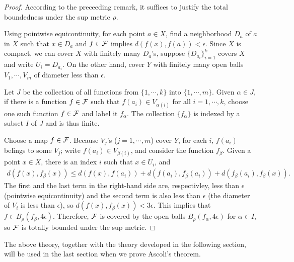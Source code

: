 \begin{proof}
    According to the preceeding remark, it suffices to justify the total boundedness under the sup metric $\rho$.

    Using pointwise equicontinuity, for each point $a\in X$, find a neighborhood $D_a$ of $a$ in $X$ such that $x\in D_a$ and $f\in{\mathcal{F}}$ implies $d(f(x), f(a))<\epsilon$.
    Since $X$ is compact, we can cover $X$ with finitely many $D_a$'s, suppose $\{D_{a_i}\}_{i=1}^k$ covers $X$ and write $U_i=D_{a_i}$.
    On the other hand, cover $Y$ with finitely many open balls $V_1, \cdots, V_m$ of diameter less than $\epsilon$.

    Let $J$ be the collection of all functions from $\{1, \cdots, k\}$ into $\{1, \cdots, m\}$.
    Given $\alpha\in J$, if there is a function $f\in{\mathcal{F}}$ such that $f(a_i)\in V_{\alpha(i)}$ for all $i=1, \cdots, k$, choose one such function $f\in{\mathcal{F}}$ and label it $f_\alpha$.
    The collection $\{f_\alpha\}$ is indexed by a subset $I$ of $J$ and is thus finite.
    
    Choose a map $f\in{\mathcal{F}}$.
    Because $V_j$'s ($j=1, \cdots, m$) cover $Y$, for each $i$, $f(a_i)$ belings to some $V_j$; write $f(a_i)\in V_{\beta(i)}$, and consider the function $f_\beta$.
    Given a point $x\in X$, there is an index $i$ such that $x\in U_i$, and
    \begin{align*}
        d(f(x), f_\beta(x)) \leq d(f(x), f(a_i))+d(f(a_i), f_\beta(a_i))+d(f_\beta(a_i), f_\beta(x)).
    \end{align*}
    The first and the last term in the right-hand side are, respectivley, less than $\epsilon$ (pointwise equicontinuity) and the second term is also less than $\epsilon$ (the diameter of $V_i$ is less than $\epsilon$), so $d(f(x), f_\beta(x))<3\epsilon$.
    This implies that $f\in B_\rho(f_\beta, 4\epsilon)$.
    Therefore, ${\mathcal{F}}$ is covered by the open balls $B_\rho(f_\alpha, 4\epsilon)$ for $\alpha\in I$, so ${\mathcal{F}}$ is totally bounded under the sup metric.
\end{proof}

The above theory, together with the theory developed in the following section, will be used in the last section when we prove Ascoli's theorem.